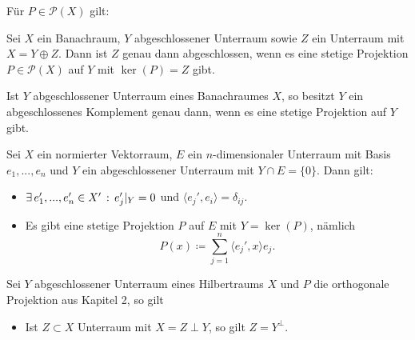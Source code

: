 \documentclass{cheat-sheet}
\begin{document}
\begin{lem}
  Für $P \in \mathcal{P}(X)$ gilt:
  \begin{itemize}
  \end{itemize}
\end{lem}

\begin{satz}
  Sei $X$ ein Banachraum, $Y$ abgeschlossener Unterraum sowie $Z$ ein Unterraum mit $X = Y \oplus Z$.
  Dann ist $Z$ genau dann abgeschlossen, wenn es eine stetige Projektion $P \in \mathcal{P}(X)$ auf $Y$ mit $\ker(P) = Z$ gibt.
\end{satz}

\begin{umformulierung}
  Ist $Y$ abgeschlossener Unterraum eines Banachraumes $X$, so besitzt $Y$ ein abgeschlossenes Komplement genau dann, wenn es eine stetige Projektion auf $Y$ gibt.
\end{umformulierung}




\begin{satz}
  Sei $X$ ein normierter Vektorraum, $E$ ein $n$-dimensionaler Unterraum mit Basis $e_1, ..., e_n$ und $Y$ ein abgeschlossener Unterraum mit $Y \cap E = \{ 0 \}$. Dann gilt:
  \begin{itemize}
    \item $\exists \, {e_1', ..., e_n' \in X'} \,:\, e_j'|_Y = 0$ und $\langle e_j', e_i \rangle = \delta_{ij}$.
    \item Es gibt eine stetige Projektion $P$ auf $E$ mit $Y = \ker(P)$, nämlich
    \[ P(x) \coloneqq \sum_{j=1}^n \langle e_j', x \rangle e_j. \]
  \end{itemize}
\end{satz}

\begin{lem}
  Sei $Y$ abgeschlossener Unterraum eines Hilbertraums $X$ und $P$ die orthogonale Projektion aus Kapitel 2, so gilt
  \begin{itemize}
    \item Ist $Z \subset X$ Unterraum mit $X = Z \perp Y$, so gilt $Z = Y^\perp$.
  \end{itemize}
\end{lem}
\end{document}
